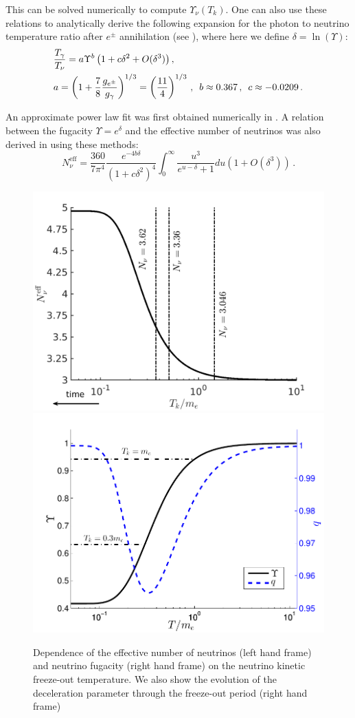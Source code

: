 This can be solved numerically to compute $\Upsilon_\nu(T_k)$. One can also use these relations to analytically derive the following expansion for the photon to neutrino temperature ratio after $e^\pm$ annihilation (see \cite{Birrell:2012gg}), where here we define $\delta=\ln(\Upsilon)$:
\begin{align}\label{eq:UpsilonRatio}
&\frac{T_\gamma}{T_\nu}=a\Upsilon^{b}\left(1+c\delta^2+O(\delta^3)\right),\\
\label{value_a}
&a=\left(1+\frac{7}{8}\frac{g_{e^\pm}}{g_\gamma}\right)^{1/3}=\left(\frac{11}{4}\right)^{1/3}\,,\,\,\,b\approx 0.367\,, \,\,\,c\approx -0.0209\,.\notag
\end{align}

An approximate power law fit was first obtained numerically in \cite{Birrell:2013gpa}. A relation between the fugacity $\Upsilon=e^\delta$ and the effective number of neutrinos  was also derived in \cite{Birrell:2012gg} using these methods:
\begin{equation}\label{eq:NnuApprox}
N^{\mathrm{eff}}_\nu=\frac{360}{7\pi^4}\frac{e^{-4b\delta}}{(1+c\delta^2)^4}\int_0^\infty \frac{u^3}{e^{u-\delta}+1}du\left(1+O(\delta^3)\right)\,.
\end{equation}


\begin{figure}
\centerline{\includegraphics[width=0.51\linewidth]{plots/N_eff.pdf}\hspace{-0.95cm}
\includegraphics[width=0.50\linewidth]{plots/Upsilon_q.pdf}}
\caption{Dependence of the effective number of neutrinos (left hand frame) and neutrino fugacity (right hand frame) on the neutrino kinetic freeze-out temperature. We also show the evolution of the deceleration parameter through the freeze-out period (right hand frame)}
\label{fig:Tk_dependence}
\end{figure}

